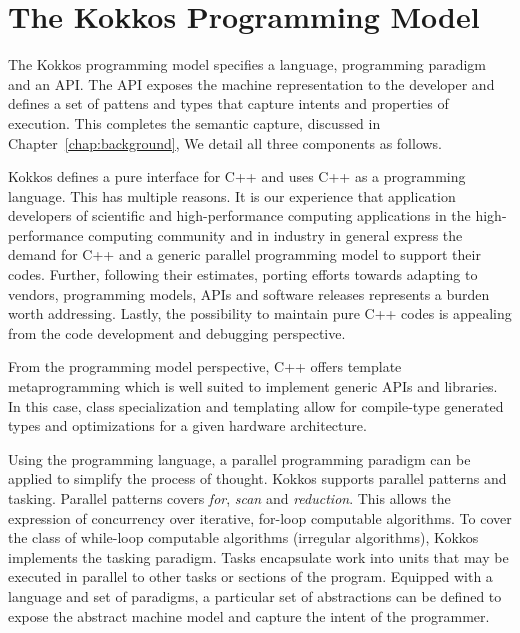 \section{The Kokkos Programming Model}\label{chap:kokkosPM}

The Kokkos programming model specifies a language, programming paradigm and an API. The API exposes the machine representation to the developer and defines a set of pattens and types that capture intents and properties of execution. This completes the semantic capture, discussed in Chapter~\ref{chap:background}, We detail all three components as follows.

Kokkos defines a pure interface for C++ and uses C++ as a programming language. This has multiple reasons. It is our experience that application developers of scientific and high-performance computing applications in the high-performance computing community and in industry in general express the demand for C++ and a generic parallel programming model to support their codes. Further, following their estimates, porting efforts towards adapting to vendors, programming models, APIs and software releases represents a burden worth addressing. Lastly, the possibility to maintain pure C++ codes is appealing from the code development and debugging perspective. 

From the programming model perspective, C++ offers template metaprogramming which is well suited to implement generic APIs and libraries. In this case, class specialization and templating allow for compile-type generated types and optimizations for a given hardware architecture. 

Using the programming language, a parallel programming paradigm can be applied to simplify the process of thought. Kokkos supports parallel patterns and tasking. Parallel patterns covers \emph{for}, \emph{scan} and \emph{reduction}. This allows the expression of concurrency over iterative, for-loop computable algorithms. To cover the class of while-loop computable algorithms (irregular algorithms), Kokkos implements the tasking paradigm. Tasks encapsulate work into units that may be executed in parallel to other tasks or sections of the program. Equipped with a language and set of paradigms, a particular set of abstractions can be defined to expose the abstract machine model and capture the intent of the programmer.

